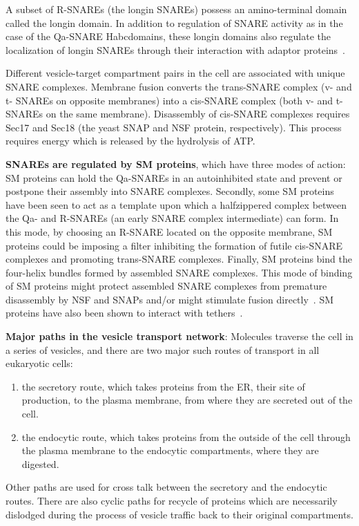 A subset of R-SNAREs (the longin SNAREs) possess an amino-terminal domain called the longin domain. 
%
In addition to regulation of SNARE activity as in the case of the Qa-SNARE Habcdomains,
these longin domains also regulate the localization of longin SNAREs through their
interaction with adaptor proteins~\cite{daste2015structure}.

Different vesicle-target compartment pairs in the cell are associated with unique SNARE
complexes.
%
Membrane fusion converts the trans-SNARE complex (v- and t- SNAREs on opposite
membranes) into a cis-SNARE complex (both v- and t- SNAREs on the same membrane).
Disassembly of cis-SNARE complexes requires Sec17 and Sec18 (the yeast SNAP and NSF
protein, respectively). 
%
This process requires energy which is released by the hydrolysis of ATP.

\textbf{SNAREs are regulated by SM proteins}, which have three modes of action: SM proteins can hold
the Qa-SNAREs in an autoinhibited state and prevent or postpone their assembly into SNARE
complexes.
%
 Secondly, some SM proteins have been seen to act as a template upon which a halfzippered
complex between the Qa- and R-SNAREs (an early SNARE complex intermediate) can
form. 
%
In this mode, by choosing an R-SNARE located on the opposite membrane, SM proteins
could be imposing a filter inhibiting the formation of futile cis-SNARE complexes and promoting
trans-SNARE complexes.
%
Finally, SM proteins bind the four-helix bundles formed by assembled
SNARE complexes.
%
 This mode of binding of SM proteins might protect assembled SNARE
complexes from premature disassembly by NSF and SNAPs and/or might stimulate fusion directly~\cite{baker2016chaperoning}.
%
SM proteins have also been shown to interact with tethers~\cite{yoon2018snare}.

\textbf{Major paths in the vesicle transport network}:
Molecules traverse the cell in a series of vesicles, and there are two major such routes of transport in all eukaryotic cells:
\begin{enumerate}
	\item the secretory route, which takes proteins from the ER, their site of production, to the plasma
	membrane, from where they are secreted out of the cell.
	\item the endocytic route, which takes proteins from the outside of the cell through the plasma
	membrane to the endocytic compartments, where they are digested.
\end{enumerate}

Other paths are used for cross talk between the secretory and the endocytic routes.
%
There are also cyclic paths for recycle of proteins which are necessarily dislodged during the process of vesicle traffic back to their original compartments. 


